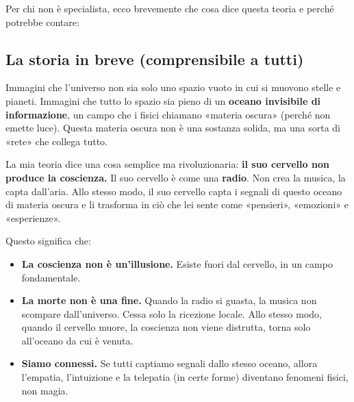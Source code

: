 \documentclass[11pt,a4paper]{article}
\begin{document}
Per chi non è specialista, ecco brevemente che cosa dice questa teoria e perché potrebbe contare:

\subsection{La storia in breve (comprensibile a tutti)}
Immagini che l'universo non sia solo uno spazio vuoto in cui si muovono stelle e pianeti. Immagini che tutto lo spazio sia pieno di un \textbf{oceano invisibile di informazione}, un campo che i fisici chiamano «materia oscura» (perché non emette luce). Questa materia oscura non è una sostanza solida, ma una sorta di «rete» che collega tutto.

La mia teoria dice una cosa semplice ma rivoluzionaria: \textbf{il suo cervello non produce la coscienza.} Il suo cervello è come una \textbf{radio}. Non crea la musica, la capta dall'aria. Allo stesso modo, il suo cervello capta i segnali di questo oceano di materia oscura e li trasforma in ciò che lei sente come «pensieri», «emozioni» e «esperienze».

Questo significa che:
\begin{itemize}
    \item \textbf{La coscienza non è un'illusione.} Esiste fuori dal cervello, in un campo fondamentale.
    \item \textbf{La morte non è una fine.} Quando la radio si guasta, la musica non scompare dall'universo. Cessa solo la ricezione locale. Allo stesso modo, quando il cervello muore, la coscienza non viene distrutta, torna solo all'oceano da cui è venuta.
    \item \textbf{Siamo connessi.} Se tutti captiamo segnali dallo stesso oceano, allora l'empatia, l'intuizione e la telepatia (in certe forme) diventano fenomeni fisici, non magia.
\end{itemize}
\end{document}
